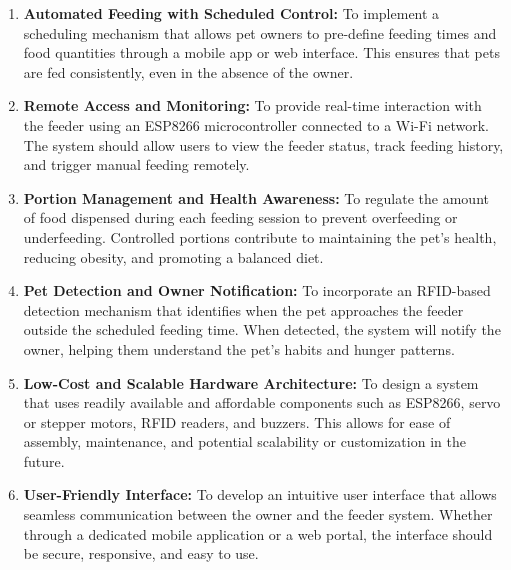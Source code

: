 \documentclass[10pt,a4paper]{extarticle}
\begin{document}
\begin{enumerate}
    \item \textbf{Automated Feeding with Scheduled Control:} To implement a scheduling mechanism that allows pet owners to pre-define feeding times and food quantities through a mobile app or web interface. This ensures that pets are fed consistently, even in the absence of the owner.
    
    \item \textbf{Remote Access and Monitoring:} To provide real-time interaction with the feeder using an ESP8266 microcontroller connected to a Wi-Fi network. The system should allow users to view the feeder status, track feeding history, and trigger manual feeding remotely.
    
    \item \textbf{Portion Management and Health Awareness:} To regulate the amount of food dispensed during each feeding session to prevent overfeeding or underfeeding. Controlled portions contribute to maintaining the pet's health, reducing obesity, and promoting a balanced diet.
    
    \item \textbf{Pet Detection and Owner Notification:} To incorporate an RFID-based detection mechanism that identifies when the pet approaches the feeder outside the scheduled feeding time. When detected, the system will notify the owner, helping them understand the pet's habits and hunger patterns.
    
    \item \textbf{Low-Cost and Scalable Hardware Architecture:} To design a system that uses readily available and affordable components such as ESP8266, servo or stepper motors, RFID readers, and buzzers. This allows for ease of assembly, maintenance, and potential scalability or customization in the future.
    
    \item \textbf{User-Friendly Interface:} To develop an intuitive user interface that allows seamless communication between the owner and the feeder system. Whether through a dedicated mobile application or a web portal, the interface should be secure, responsive, and easy to use.
    

\end{enumerate}
\end{document}
